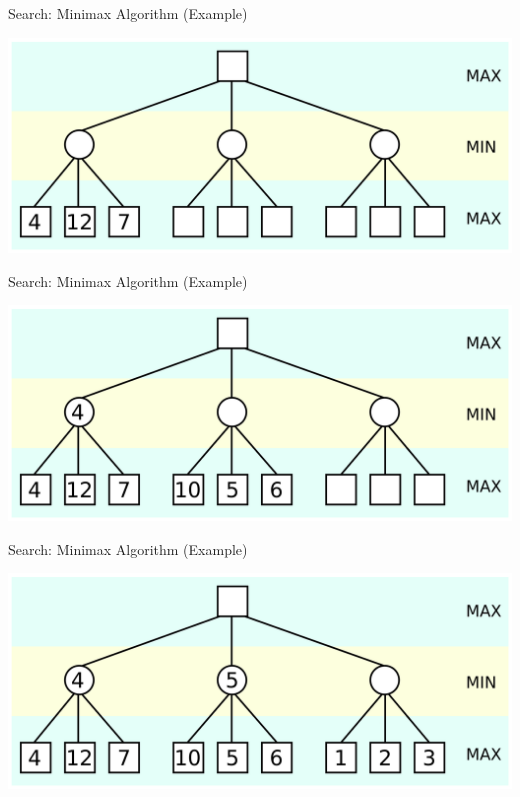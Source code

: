 \documentclass[xcolor=pdftex,dvipsnames,table]{beamer}
\begin{document}
\begin{frame}{Search: Minimax Algorithm (Example)}
\begin{center}
\includegraphics[width=\textwidth,height=\textheight,keepaspectratio]{minimax5.png}
\end{center}
\end{frame}

\begin{frame}{Search: Minimax Algorithm (Example)}
\begin{center}
\includegraphics[width=\textwidth,height=\textheight,keepaspectratio]{minimax4.png}
\end{center}
\end{frame}

\begin{frame}{Search: Minimax Algorithm (Example)}
\begin{center}
\includegraphics[width=\textwidth,height=\textheight,keepaspectratio]{minimax3.png}
\end{center}
\end{frame}
\end{document}
